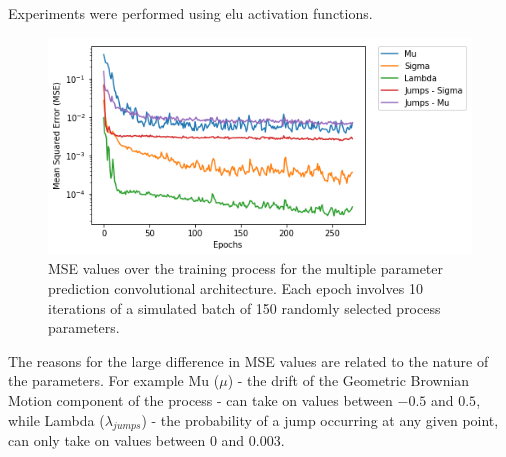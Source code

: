 \documentclass[11pt,oneside,openany,a4paper,english, report, goldenblock
]{usthesis}
\begin{document}
Experiments were performed using \acrshort{elu} activation functions. 

\begin{figure}[h]
	\centering
	\includegraphics[width=0.7\linewidth]{Images/Results/Training/COVNET_MO_MSE}
	\caption[MSE values over the training process for the 8-Layer \acrshort{cnn}]{MSE values over the training process for the multiple parameter prediction convolutional architecture. Each epoch involves 10 iterations of a simulated batch of 150 randomly selected process parameters.}
	\label{fig:covnetmomse}
\end{figure}

The reasons for the large difference in MSE values are related to the nature of the parameters. For example Mu ($\mu$) - the drift of the Geometric Brownian Motion component of the process - can take on values between $-0.5$ and $0.5$, while Lambda ($\lambda_{jumps}$) - the probability of a jump occurring at any given point, can only take on values between $0$ and $0.003$.
\end{document}

